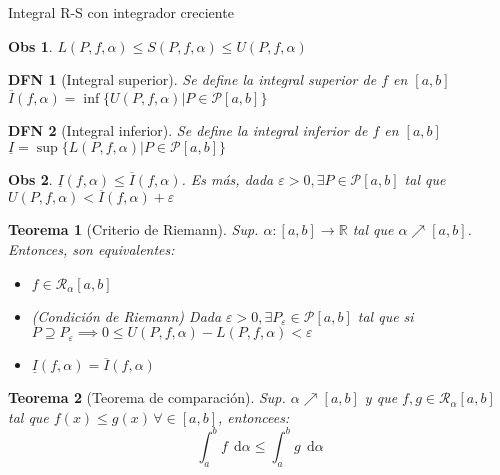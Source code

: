 \documentclass[a4paper]{article}\usepackage{/home/alonso/Documents/Projects/formularios/styles}
\newtheorem{definition}{DFN}
\theoremstyle{mytheoremstyle}
\newtheorem{theorem}{Teorema}
\newtheorem*{obs}{Obs}
\newcommand{\R}{\mathbb{R}}
\newcommand{\1}{\mathds{1}}
\newcommand{\diff}[1]{\,\mathrm{d}#1}
\begin{document}
\begin{multicols*}{3}
\begin{roundbox}{Integral R-S con integrador creciente}
	\begin{obs}
		$ L(P,f,\alpha) \leq S(P,f,\alpha) \leq U(P,f,\alpha)$
	\end{obs}

	\begin{definition}[Integral superior]
		Se define la integral superior de $ f $ en $ [a,b] $
		$ \overline{I}(f,\alpha) = \inf \{ U(P,f,\alpha) | P \in \mathcal{P}[a,b]\} $
	\end{definition}

	\begin{definition}[Integral inferior]
		Se define la integral inferior de $ f $ en $ [a,b] $
		$ \underline{I} = \sup \{ L(P,f,\alpha) | P \in \mathcal{P}[a,b]\} $
	\end{definition}

	\begin{obs}
		$ \underline{I}(f,\alpha) \leq \overline{I}(f,\alpha) $. Es más, dada $ \varepsilon > 0, \exists P \in \mathcal{P}[a,b] $ tal que $ U(P,f,\alpha) < \overline{I}(f,\alpha) + \varepsilon $
	\end{obs}

	\begin{theorem}[Criterio de Riemann]
		Sup. $ \alpha : [a,b] \to \R  $ tal que $ \alpha \nearrow [a,b] $. Entonces, son equivalentes:
		\begin{itemize}
			\item $ f \in \mathcal{R}_{\alpha}[a,b] $
			\item (Condición de Riemann) Dada $ \varepsilon > 0, \exists P_{\varepsilon} \in \mathcal{P}[a,b]$ tal que si $  P \supseteq  P_{\varepsilon} \implies 0 \leq U(P,f,\alpha) - L(P,f,\alpha) < \varepsilon$
			\item $ \underline{I}(f,\alpha) = \overline{I}(f,\alpha) $
		\end{itemize}
	\end{theorem}

	\begin{theorem}[Teorema de comparación]
		Sup. $ \alpha \nearrow [a,b] $ y que $ f,g \in \mathcal{R}_{\alpha}[a,b]$ tal que $ f(x) \leq g(x) \, \forall \in [a,b] $, entoncees:
		\[
			\int_{a}^{b} f \; \diff{\alpha}  \leq \int_{a}^{b} g \; \diff{\alpha}
		\]
	\end{theorem}

\end{roundbox}


\end{multicols*}
\end{document}
